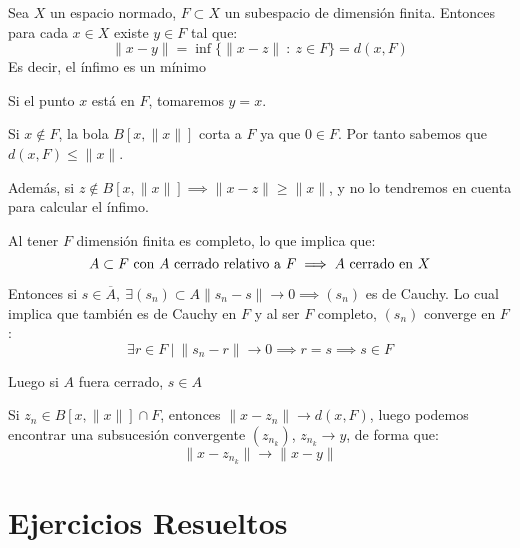 \documentclass[openany]{book}
\begin{document}
\begin{proposition}
  Sea $ X $ un espacio normado, $ F \subset X $ un subespacio de dimensión finita. Entonces para cada $ x \in X $ existe $ y \in F $ tal que:
  $$ \|x-y\| = \inf \{\|x-z\|\ :\ z \in F\} = d(x,F) $$
  Es decir, el ínfimo es un mínimo
\end{proposition}

\begin{demonstration}
  Si el punto $ x $ está en $ F $, tomaremos $ y = x $.

  Si $ x \not \in F $, la bola $ B[x,\|x\|] $ corta a $ F $ ya que $ 0 \in F $. Por tanto sabemos que $ d(x,F) \leq \|x\| $.
  
  Además, si $ z \not \in B[x,\|x\|] \implies \|x-z\| \geq  \|x\|$, y no lo tendremos en cuenta para calcular el ínfimo.

  Al tener $ F $ dimensión finita es completo, lo que implica que:
  $$ A \subset F\ \text{con $ A $ cerrado relativo a $ F $} \implies A\ \text{cerrado en $ X $} $$

  Entonces si $ s \in \overline{A},\ \exists (s_n)\subset A \|s_n-s\| \to 0 \implies (s_n)$ es de Cauchy. Lo cual implica que también es de Cauchy en $ F $ y al ser $ F $ completo, $ (s_n) $ converge en $ F $:
  $$ \exists r \in F\ |\ \|s_n - r\| \to 0 \implies r = s \implies s \in F $$

  Luego si $ A $ fuera cerrado, $ s \in A $

  Si $ z_n \in B[x,\|x\|] \cap F $, entonces $ \|x-z_n\| \to d(x,F) $, luego podemos encontrar una subsucesión convergente $ (z_{n_{k}}) $, $ z_{n_{k}} \to y $, de forma que:
  $$ \|x-z_{n_{k}}\| \to \|x-y\|$$
\end{demonstration}


\chapter{Ejercicios Resueltos}
\end{document}
